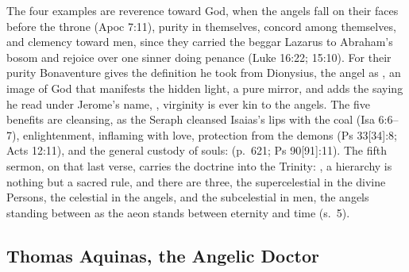 The four examples are reverence toward God, when the angels fall on their
faces before the throne (Apoc 7:11), purity in themselves, concord among
themselves, and clemency toward men, since they carried the beggar Lazarus
to Abraham's bosom and rejoice over one sinner doing penance (Luke 16:22;
15:10). For their purity Bonaventure gives the definition he took from
Dionysius, the angel as , an image of God that manifests the hidden light, a pure
mirror, and adds the saying he read under Jerome's name, , virginity is ever kin to the angels.
The five benefits are cleansing, as the Seraph cleansed Isaias's lips with
the coal (Isa 6:6--7), enlightenment, inflaming with love, protection from
the demons (Ps 33[34]:8; Acts 12:11), and the general custody of souls:
 (p.~621; Ps 90[91]:11).
The fifth sermon, on that last verse, carries the doctrine into the
Trinity: , a
hierarchy is nothing but a sacred rule, and there are three, the
supercelestial in the divine Persons, the celestial in the angels, and the
subcelestial in men, the angels standing between as the aeon stands between
eternity and time (s.~5).

\sectionguard\subsection{Thomas Aquinas, the Angelic Doctor}\label{sec:sa-aquinas}

